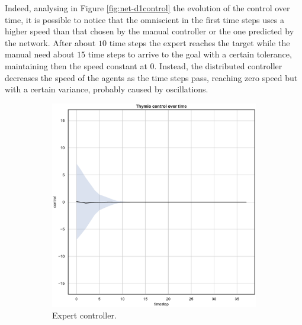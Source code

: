 Indeed, analysing in Figure \ref{fig:net-d1control} the evolution of the control 
over time, it is possible to notice that the omniscient in the first time steps uses a 
higher speed than that chosen by the manual controller or the one predicted by 
the network. 
After about $10$ time steps the expert reaches the target while the manual need 
about $15$ time steps to arrive to the goal with a certain tolerance, maintaining 
then the speed constant at $0$. Instead, the distributed controller decreases the 
speed of the agents as the time steps pass, reaching zero speed but with a certain 
variance, probably caused by oscillations.
\begin{figure}[!htb]
	\centering
	\begin{subfigure}[h]{0.3\textwidth}
		\centering
		\includegraphics[width=\textwidth]{contents/images/net-d1/control-overtime-omniscient}%
		\caption{Expert controller.}
	\end{subfigure}
	\hfill
	\begin{subfigure}[h]{0.3\textwidth}
		\centering

\end{subfigure}
\end{figure}
